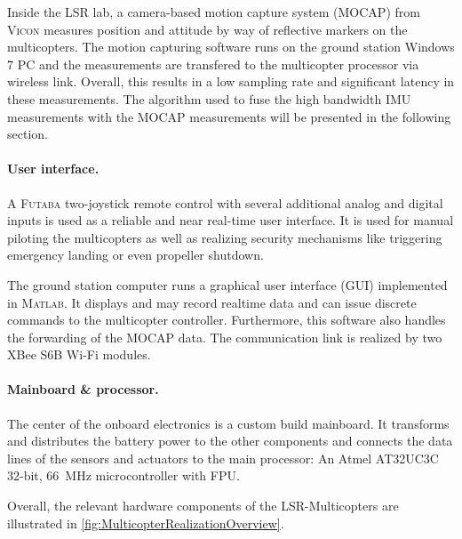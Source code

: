 Inside the LSR lab, a camera-based motion capture system (MOCAP) from \textsc{Vicon} measures position and attitude by way of reflective markers on the multicopters.
The motion capturing software runs on the ground station Windows 7 PC and the measurements are transfered to the multicopter processor via wireless link.
Overall, this results in a low sampling rate and significant latency in these measurements.
The algorithm used to fuse the high bandwidth IMU measurements with the MOCAP measurements will be presented in the following section.

\paragraph{User interface.}
A \textsc{Futaba} two-joystick remote control with several additional analog and digital inputs is used as a reliable and near real-time user interface.
It is used for manual piloting the multicopters as well as realizing security mechanisms like triggering emergency landing or even propeller shutdown.

The ground station computer runs a graphical user interface (GUI) implemented in \textsc{Matlab}. 
It displays and may record realtime data and can issue discrete commands to the multicopter controller.
Furthermore, this software also handles the forwarding of the MOCAP data. 
The communication link is realized by two XBee S6B Wi-Fi modules.

\paragraph{Mainboard \& processor.}
The center of the onboard electronics is a custom build mainboard.
It transforms and distributes the battery power to the other components and connects the data lines of the sensors and actuators to the main processor:
An Atmel AT32UC3C 32-bit, 66~\unit{MHz} microcontroller with FPU.

Overall, the relevant hardware components of the LSR-Multicopters are illustrated in \autoref{fig:MulticopterRealizationOverview}.


